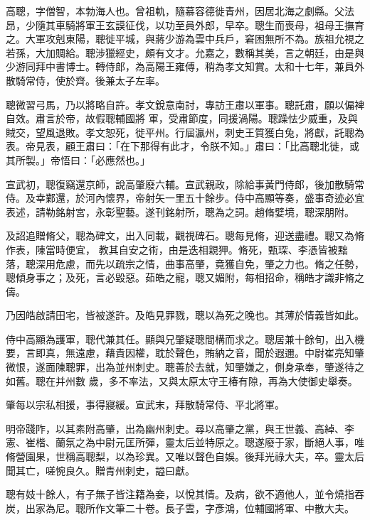 \begin{pinyinscope}
 高聰，字僧智，本勃海人也。曾祖軌，隨慕容德徙青州，因居北海之劇縣。父法昂，少隨其車騎將軍王玄謨征伐，以功至員外郎，早卒。聰生而喪母，祖母王撫育之。大軍攻剋東陽，聰徙平城，與蔣少游為雲中兵戶，窘困無所不為。族祖允視之若孫，大加賙給。聰涉獵經史，頗有文才。允嘉之，數稱其美，言之朝廷，由是與少游同拜中書博士。轉侍郎，為高陽王雍傅，稍為孝文知賞。太和十七年，兼員外散騎常侍，使於齊。後兼太子左率。



 聰微習弓馬，乃以將略自許。孝文銳意南討，專訪王肅以軍事。聰託肅，願以偏裨自效。肅言於帝，故假聰輔國將
 軍，受肅節度，同援渦陽。聰躁怯少威重，及與賊交，望風退敗。孝文恕死，徙平州。行屆瀛州，刺史王質獲白兔，將獻，託聰為表。帝見表，顧王肅曰：「在下那得有此才，令朕不知。」肅曰：「比高聰北徙，或其所製。」帝悟曰：「必應然也。」



 宣武初，聰復竊還京師，說高肇廢六輔。宣武親政，除給事黃門侍郎，後加散騎常侍。及幸鄴還，於河內懷界，帝射矢一里五十餘步。侍中高顯等奏，盛事奇迹必宜表述，請勒銘射宮，永彰聖藝。遂刊銘射所，聰為之詞。趙脩嬖境，聰深朋附。



 及詔追贈脩父，聰為碑文，出入同載，觀視碑石。聰每見脩，迎送盡禮。聰又為脩作表，陳當時便宜，
 教其自安之術，由是迭相親狎。脩死，甄琛、李憑皆被黜落，聰深用危慮，而先以疏宗之情，曲事高肇，竟獲自免，肇之力也。脩之任勢，聰傾身事之；及死，言必毀惡。茹皓之寵，聰又媚附，每相招命，稱皓才識非脩之儔。



 乃因皓啟請田宅，皆被遂許。及皓見罪戮，聰以為死之晚也。其薄於情義皆如此。



 侍中高顯為護軍，聰代兼其任。顯與兄肇疑聰間構而求之。聰居兼十餘旬，出入機要，言即真，無遠慮，藉貴因權，耽於聲色，賄納之音，聞於遐邇。中尉崔亮知肇微恨，遂面陳聰罪，出為並州刺史。聰善於去就，知肇嫌之，側身承奉，肇遂待之如舊。聰在并州數
 歲，多不率法，又與太原太守王椿有隙，再為大使御史舉奏。



 肇每以宗私相援，事得寢緩。宣武末，拜散騎常侍、平北將軍。



 明帝踐阼，以其素附高肇，出為幽州刺史。尋以高肇之黨，與王世義、高綽、李憲、崔楷、蘭氛之為中尉元匡所彈，靈太后並特原之。聰遂廢于家，斷絕人事，唯脩營園果，世稱高聰梨，以為珍異。又唯以聲色自娛。後拜光祿大夫，卒。靈太后聞其亡，嗟惋良久。贈青州刺史，謚曰獻。



 聰有妓十餘人，有子無子皆注籍為妾，以悅其情。及病，欲不適他人，並令燒指吞炭，出家為尼。聰所作文筆二十卷。長子雲，字彥鴻，位輔國將軍、中散大夫。




\end{pinyinscope}
